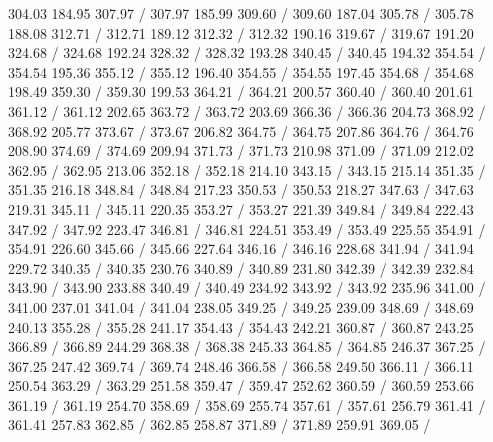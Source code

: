 { 304.03 184.95 307.97 /
 307.97 185.99 309.60 /
 309.60 187.04 305.78 /
 305.78 188.08 312.71 /
 312.71 189.12 312.32 /
 312.32 190.16 319.67 /
 319.67 191.20 324.68 /
 324.68 192.24 328.32 /
 328.32 193.28 340.45 /
 340.45 194.32 354.54 /
 354.54 195.36 355.12 /
 355.12 196.40 354.55 /
 354.55 197.45 354.68 /
 354.68 198.49 359.30 /
 359.30 199.53 364.21 /
 364.21 200.57 360.40 /
 360.40 201.61 361.12 /
 361.12 202.65 363.72 /
 363.72 203.69 366.36 /
 366.36 204.73 368.92 /
 368.92 205.77 373.67 /
 373.67 206.82 364.75 /
 364.75 207.86 364.76 /
 364.76 208.90 374.69 /
 374.69 209.94 371.73 /
 371.73 210.98 371.09 /
 371.09 212.02 362.95 /
 362.95 213.06 352.18 /
 352.18 214.10 343.15 /
 343.15 215.14 351.35 /
 351.35 216.18 348.84 /
 348.84 217.23 350.53 /
 350.53 218.27 347.63 /
 347.63 219.31 345.11 /
 345.11 220.35 353.27 /
 353.27 221.39 349.84 /
 349.84 222.43 347.92 /
 347.92 223.47 346.81 /
 346.81 224.51 353.49 /
 353.49 225.55 354.91 /
 354.91 226.60 345.66 /
 345.66 227.64 346.16 /
 346.16 228.68 341.94 /
 341.94 229.72 340.35 /
 340.35 230.76 340.89 /
 340.89 231.80 342.39 /
 342.39 232.84 343.90 /
 343.90 233.88 340.49 /
 340.49 234.92 343.92 /
 343.92 235.96 341.00 /
 341.00 237.01 341.04 /
 341.04 238.05 349.25 /
 349.25 239.09 348.69 /
 348.69 240.13 355.28 /
 355.28 241.17 354.43 /
 354.43 242.21 360.87 /
 360.87 243.25 366.89 /
 366.89 244.29 368.38 /
 368.38 245.33 364.85 /
 364.85 246.37 367.25 /
 367.25 247.42 369.74 /
 369.74 248.46 366.58 /
 366.58 249.50 366.11 /
 366.11 250.54 363.29 /
 363.29 251.58 359.47 /
 359.47 252.62 360.59 /
 360.59 253.66 361.19 /
 361.19 254.70 358.69 /
 358.69 255.74 357.61 /
 357.61 256.79 361.41 /
 361.41 257.83 362.85 /
 362.85 258.87 371.89 /
 371.89 259.91 369.05 /
}
